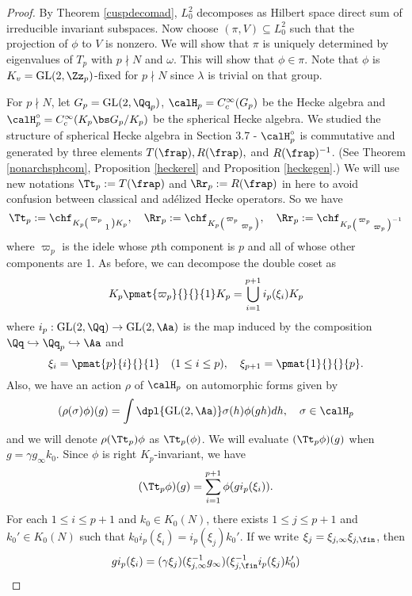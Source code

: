 \documentclass{article}
\newcommand{\GL}{\mathrm{GL}}
\newcommand{\smat}[4]{\left(\begin{smallmatrix} #1 & #2 \\ #3 & #4 \end{smallmatrix}\right)}
\begin{document}
\begin{proof}
By Theorem \ref{cuspdecomad}, $L^{2}_{0}$ decomposes as Hilbert space direct sum of irreducible invariant subspaces. Now choose $(\pi, V) \subseteq L_{0}^{2}$ such that the projection of $\phi$ to $V$ is nonzero. We will show that $\pi$ is uniquely determined by eigenvalues of $T_{p}$ with $p\nmid N$ and $\omega$. 
This will show that $\phi \in \pi$. Note that $\phi$ is $K_{v} = \GL(2, \Zz_{p})$-fixed for $p\nmid N$ since $\lambda$ is trivial on that group. 

For $p\nmid N$, let $G_{p} = \GL(2, \Qq_{p})$, $\calH_{p} =C_{c}^{\infty}(G_p)$ be the Hecke algebra and $\calH_{p}^{\circ} = C_{c}^{\infty}(K_{p} \bs G_{p} / K_p)$ be the spherical Hecke algebra. 
We studied the structure of spherical Hecke algebra in Section 3.7 - $\calH_p^{\circ}$ is commutative and generated by three elements $T(\frap), R(\frap),$ and $R(\frap)^{-1}$. (See Theorem \ref{nonarchsphcom}, Proposition \ref{heckerel} and Proposition \ref{heckegen}.) 
We will use new notations $\Tt_{p} := T(\frap)$ and $\Rr_{p} := R(\frap)$ in here to avoid confusion between classical and ad\'elized Hecke operators. 
So we have
$$
\Tt_{p} := \chf_{K_{p} \smat{\varpi_p}{}{}{1} K_{p}}, \quad \Rr_{p} := \chf_{K_{p} \smat{\varpi_{p}}{}{}{\varpi_{p}}}, \quad \Rr_{p} := \chf_{K_{p} \smat{\varpi_{p}}{}{}{\varpi_p}^{-1}}
$$
where $\varpi_{p}$ is the idele whose $p$th component is $p$ and all of whose other components are 1. 
As before, we can decompose the double coset as
$$
K_{p} \pmat{\varpi_p}{}{}{1} K_{p} = \bigcup_{i=1}^{p+1} i_{p}(\xi_{i})K_p
$$ 
where $i_{p}: \GL(2, \Qq) \to \GL(2, \Aa)$ is the map induced by the composition $\Qq\hookrightarrow \Qq_p \hookrightarrow \Aa$ and 
$$
\xi_{i} = \pmat{p}{i}{}{1} \quad (1\leq i\leq p), \quad \xi_{p+1} = \pmat{1}{}{}{p}.
$$
Also, we have an action $\rho$ of $\calH_{p}$ on automorphic forms given by 
$$
(\rho(\sigma)\phi)(g) = \int\dpl{\GL(2, \Aa)} \sigma(h)\phi(gh)dh, \quad \sigma\in \calH_p
$$
and we will denote $\rho(\Tt_{p})\phi$ as $\Tt_{p}(\phi)$. We will evaluate $(\Tt_{p}\phi)(g)$ when $g = \gamma g_{\infty} k_{0}$.  
Since $\phi$ is right $K_{p}$-invariant, we have
$$
(\Tt_{p}\phi)(g) = \sum_{i=1}^{p+1} \phi(gi_{p}(\xi_{i})).
$$
For each $1\leq i\leq p+1$ and $k_{0} \in K_{0}(N)$, there exists $1\leq j\leq p+1$ and $k_{0}'\in K_{0}(N)$ such that $k_{0}i_{p}(\xi_{i}) = i_{p}(\xi_{j})k_{0}'$. If we write $\xi_{j} = \xi_{j, \infty}\xi_{j, \fin}$, then 
$$
gi_{p}(\xi_{i}) = (\gamma\xi_{j}) (\xi_{j, \infty}^{-1}g_{\infty}) (\xi_{j, \fin}^{-1}i_{p}(\xi_{j})k_{0}')
$$

\end{proof}
\end{document}
